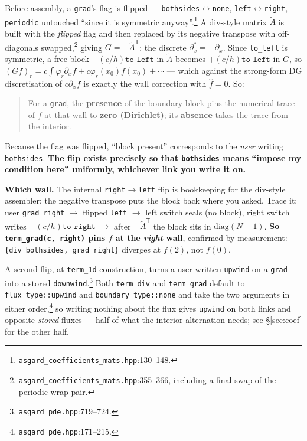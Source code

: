 \documentclass[10pt]{article}
\newcommand{\code}[1]{\texttt{#1}}
\newcommand{\hf}{\widehat{f}}
\newcommand{\fl}[2]{\texttt{#1}:#2}
\begin{document}
Before assembly, a \code{grad}'s flag is flipped ---
\code{bothsides}$\leftrightarrow$\code{none},
\code{left}$\leftrightarrow$\code{right}, \code{periodic} untouched ``since it is
symmetric anyway''.\footnote{\fl{asgard\_coefficients\_mats.hpp}{130--148}.} A
div-style matrix $\widetilde A$ is built with the \emph{flipped} flag and then
replaced by its negative transpose with off-diagonals
swapped,\footnote{\fl{asgard\_coefficients\_mats.hpp}{355--366}, including a
final swap of the periodic wrap pair.} giving $G=-\widetilde A^{\mathsf T}$: the
discrete $\partial_x^*=-\partial_x$. Since \code{to\_left} is symmetric, a free
block $-(c/h)\code{to\_left}$ in $\widetilde A$ becomes $+(c/h)\code{to\_left}$
in $G$, so $(Gf)_r=c\int\varphi_r\partial_xf+c\varphi_r(x_0)f(x_0)+\cdots$ ---
which against the strong-form DG discretisation of $c\partial_xf$ is exactly the
wall correction with $\hf=0$. So:
\begin{quote}
For a \code{grad}, the \textbf{presence} of the boundary block pins the numerical
trace of $f$ at that wall to \textbf{zero (Dirichlet)}; its \textbf{absence}
takes the trace from the interior.
\end{quote}
Because the flag was flipped, ``block present'' corresponds to the \emph{user}
writing \code{bothsides}. \textbf{The flip exists precisely so that
\code{bothsides} means ``impose my condition here'' uniformly, whichever link you
write it on.}

\textbf{Which wall.} The internal \code{right}$\to$\code{left} flip is
bookkeeping for the div-style assembler; the negative transpose puts the block
back where you asked. Trace it: user \code{grad right} $\to$ flipped
\code{left} $\to$ left switch seals (no block), right switch writes
$+(c/h)\code{to\_right}$ $\to$ after $-\widetilde A^{\mathsf T}$ the block sits in
$\mathrm{diag}(N{-}1)$. \textbf{So \code{term\_grad(c, right)} pins $f$ at the
\emph{right} wall}, confirmed by measurement: \code{\{div bothsides, grad right\}}
diverges at $f(2)$, not $f(0)$.

A second flip, at \code{term\_1d} construction, turns a user-written
\code{upwind} on a \code{grad} into a stored
\code{downwind}.\footnote{\fl{asgard\_pde.hpp}{719--724}.} Both
\code{term\_div} and \code{term\_grad} default to \code{flux\_type::upwind} and
\code{boundary\_type::none} and take the two arguments in either
order,\footnote{\fl{asgard\_pde.hpp}{171--215}.} so writing nothing about the
flux gives \code{upwind} on both links and opposite \emph{stored} fluxes --- half
of what the interior alternation needs; see \S\ref{sec:coef} for the other half.
\end{document}
